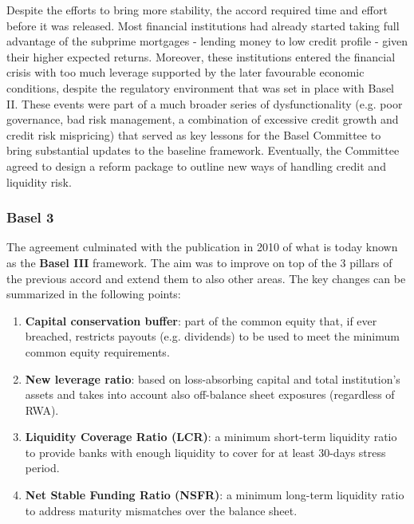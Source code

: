 \documentclass[a4paper,12pt]{article}
\begin{document}
    Despite the efforts to bring more stability, 
    the accord required time and effort before it was released. 
    Most financial institutions had already started taking 
    full advantage of the subprime mortgages - lending money to low credit profile - 
    given their higher expected returns. 
    Moreover, these institutions entered the financial crisis with too much leverage 
    supported by the later favourable economic conditions, despite the regulatory 
    environment that was set in place with Basel II. These events were part of a 
    much broader series of dysfunctionality (e.g. poor governance, bad risk management, 
    a combination of excessive credit growth and credit risk mispricing) 
    that served as key lessons for the Basel Committee to bring substantial updates 
    to the baseline framework. Eventually, the Committee agreed to design a reform 
    package to outline new ways of handling credit and liquidity risk.

    \subsubsection[]{Basel 3}
    The agreement culminated with the publication in 2010 of what is today known 
    as the \textbf{Basel III} framework. The aim was to improve on top of the 3 
    pillars of the previous accord and extend them to also other areas. 
    The key changes can be summarized in the following points:
    
        \begin{enumerate}
            \item \textbf{Capital conservation buffer}\cite{}: part of the common equity that, if ever breached, restricts payouts (e.g. dividends) to be used to meet the minimum common equity requirements.
            \item \textbf{New leverage ratio}\cite{}: based on loss-absorbing capital and total institution's assets and takes into account also off-balance sheet exposures (regardless of RWA).
            \item \textbf{Liquidity Coverage Ratio (LCR)}\cite{}: a minimum short-term liquidity ratio to provide banks with enough liquidity to cover for at least 30-days stress period.
            \item \textbf{Net Stable Funding Ratio (NSFR)}\cite{}: a minimum long-term liquidity ratio to address maturity mismatches over the balance sheet.
        \end{enumerate}
\end{document}

